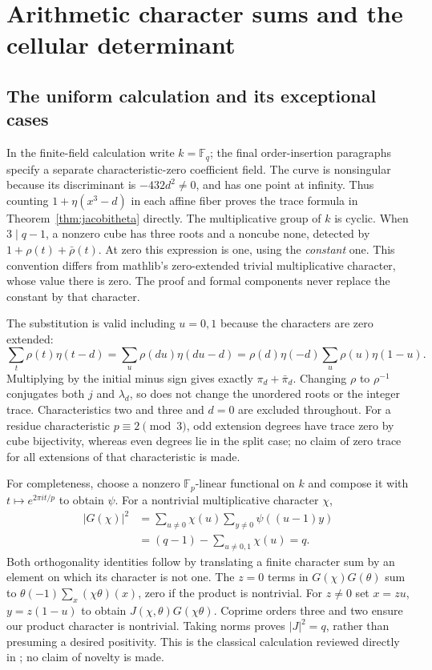 \documentclass[11pt,oneside,openany]{book}
\theoremstyle{definition}\newtheorem{definition}[theorem]{Definition}
\theoremstyle{remark}\newtheorem{remark}[theorem]{Remark}
\begin{document}
\chapter{Arithmetic character sums and the cellular determinant}
\section{The uniform calculation and its exceptional cases}
In the finite-field calculation write $k=\mathbb F_q$; the final order-insertion paragraphs specify a separate characteristic-zero coefficient field. The curve is nonsingular because its discriminant is $-432d^2\ne0$, and has one point at infinity. Thus counting $1+\eta(x^3-d)$ in each affine fiber proves the trace formula in Theorem~\ref{thm:jacobitheta} directly. The multiplicative group of $k$ is cyclic. When $3\mid q-1$, a nonzero cube has three roots and a noncube none, detected by $1+\rho(t)+\bar\rho(t)$. At zero this expression is one, using the \emph{constant} one. This convention differs from mathlib's zero-extended trivial multiplicative character, whose value there is zero. The proof and formal components never replace the constant by that character.

The substitution is valid including $u=0,1$ because the characters are zero extended:
\[
 \sum_t\rho(t)\eta(t-d)
 =\sum_u\rho(du)\eta(du-d)
 =\rho(d)\eta(-d)\sum_u\rho(u)\eta(1-u).
\]
Multiplying by the initial minus sign gives exactly $\pi_d+\bar\pi_d$. Changing $\rho$ to $\rho^{-1}$ conjugates both $j$ and $\lambda_d$, so does not change the unordered roots or the integer trace. Characteristics two and three and $d=0$ are excluded throughout. For a residue characteristic $p\equiv2\pmod3$, odd extension degrees have trace zero by cube bijectivity, whereas even degrees lie in the split case; no claim of zero trace for all extensions of that characteristic is made.

For completeness, choose a nonzero $\mathbb F_p$-linear functional on $k$ and compose it with $t\mapsto e^{2\pi it/p}$ to obtain $\psi$. For a nontrivial multiplicative character $\chi$,
\[
 \begin{aligned}
 |G(\chi)|^2
 &=\sum_{u\ne0}\chi(u)\sum_{y\ne0}\psi((u-1)y)\\
 &=(q-1)-\sum_{u\ne0,1}\chi(u)=q.
 \end{aligned}
\]
Both orthogonality identities follow by translating a finite character sum by an element on which its character is not one. The $z=0$ terms in $G(\chi)G(\theta)$ sum to $\theta(-1)\sum_x(\chi\theta)(x)$, zero if the product is nontrivial. For $z\ne0$ set $x=zu$, $y=z(1-u)$ to obtain $J(\chi,\theta)G(\chi\theta)$. Coprime orders three and two ensure our product character is nontrivial. Taking norms proves $|J|^2=q$, rather than presuming a desired positivity. This is the classical calculation reviewed directly in \cite{WeilJacobi}; no claim of novelty is made.
\end{document}

